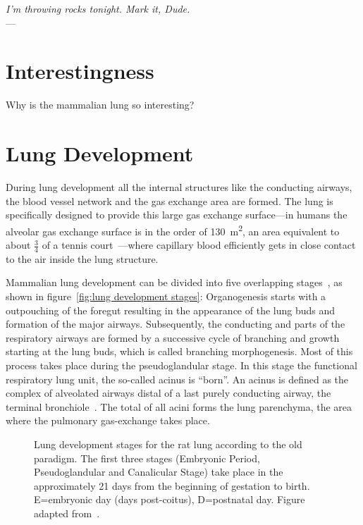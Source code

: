 \label{ch:lung}
\begin{flushright}{\slshape I'm throwing rocks tonight. Mark it, Dude.} \\ \medskip
    ---  \citep{TheBigLebowski}
\end{flushright}
\bigskip
\section{Interestingness}
Why is the mammalian lung so interesting?

\section{Lung Development}
During lung development all the internal structures like the conducting airways, the blood vessel network and the gas exchange area are formed. The lung is specifically designed to provide this large gas exchange surface---in humans the alveolar gas exchange surface is in the order of \SI{130}{\meter\squared}, an area equivalent to about $\frac{3}{4}$ of a tennis court~\cite{Weibel2009}---where capillary blood efficiently gets in close contact to the air inside the lung structure. 

Mammalian lung development can be divided into five overlapping stages~\cite{Schittny2004,Schittny2007a}, as shown in figure~\ref{fig:lung development stages}: Organogenesis starts with a outpouching of the foregut resulting in the appearance of the lung buds and formation of the major airways. Subsequently, the conducting and parts of the respiratory airways are formed by a successive cycle of branching and growth starting at the lung buds, which is called branching morphogenesis. Most of this process takes place during the pseudoglandular stage. In this stage the functional respiratory lung unit, the so-called acinus is ``born''. An acinus is defined as the complex of alveolated airways distal of a last purely conducting airway, the terminal bronchiole~\cite{Rodriguez1987}. The total of all acini forms the lung parenchyma, the area where the pulmonary gas-exchange takes place.

\begin{figure}[h!]
	\centering
	\caption[Lung development stages]{Lung development stages for the rat lung according to the old paradigm. The first three stages (Embryonic Period, Pseudoglandular and Canalicular Stage) take place in the approximately 21 days from the beginning of gestation to birth. E=embryonic day (days post-coitus), D=postnatal day. Figure adapted from~\cite{Schittny2007a}.}
	\label{fig:lung development stages old}
\end{figure}

